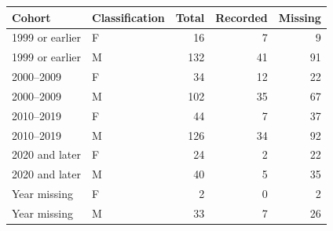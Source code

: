 \begin{tabular}{llrrr}
\toprule
Cohort & Classification & Total & Recorded & Missing \\
\midrule
1999 or earlier & F & 16 & 7 & 9 \\
1999 or earlier & M & 132 & 41 & 91 \\
2000--2009 & F & 34 & 12 & 22 \\
2000--2009 & M & 102 & 35 & 67 \\
2010--2019 & F & 44 & 7 & 37 \\
2010--2019 & M & 126 & 34 & 92 \\
2020 and later & F & 24 & 2 & 22 \\
2020 and later & M & 40 & 5 & 35 \\
Year missing & F & 2 & 0 & 2 \\
Year missing & M & 33 & 7 & 26 \\
\bottomrule
\end{tabular}
